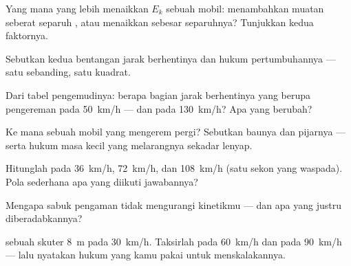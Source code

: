 \begin{exercise}[$\star$]\label{exo:g9:kinetic-energy-safety:3}
Yang mana yang lebih menaikkan $E_k$ sebuah mobil: menambahkan muatan
seberat separuh , atau menaikkan  sebesar
separuhnya? Tunjukkan kedua faktornya.
\end{exercise}

\begin{exercise}[$\star$]\label{exo:g9:kinetic-energy-safety:4}
Sebutkan kedua bentangan jarak berhentinya dan hukum pertumbuhannya
--- satu sebanding, satu kuadrat.
\end{exercise}

\begin{exercise}[$\star$]\label{exo:g9:kinetic-energy-safety:5}
Dari tabel pengemudinya: berapa bagian jarak berhentinya yang berupa
pengereman pada \qty{50}{km/h} --- dan pada \qty{130}{km/h}? Apa yang
berubah?
\end{exercise}

\begin{exercise}[$\star$]\label{exo:g9:kinetic-energy-safety:6}
Ke mana  sebuah mobil yang mengerem pergi? Sebutkan
baunya dan pijarnya --- serta hukum masa kecil yang melarangnya
sekadar lenyap.
\end{exercise}

\begin{exercise}[$\star$]\label{exo:g9:kinetic-energy-safety:7}
Hitunglah  pada \qty{36}{km/h}, \qty{72}{km/h}, dan
\qty{108}{km/h} (satu sekon yang waspada). Pola sederhana apa yang
diikuti jawabannya?
\end{exercise}

\begin{exercise}[$\star$]\label{exo:g9:kinetic-energy-safety:8}
Mengapa sabuk pengaman tidak mengurangi  kinetikmu --- dan apa
yang justru diberadabkannya?
\end{exercise}

\begin{exercise}[$\star\star$]\label{exo:g9:kinetic-energy-safety:9}
 sebuah skuter \qty{8}{m} pada \qty{30}{km/h}.
Taksirlah pada \qty{60}{km/h} dan pada \qty{90}{km/h} --- lalu
nyatakan hukum yang kamu pakai untuk menskalakannya.
\end{exercise}

